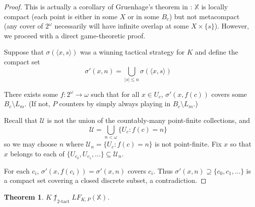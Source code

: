 \documentclass[11pt]{article}
\theoremstyle{plain}
\newtheorem{theorem}{Theorem}
\theoremstyle{definition}
\theoremstyle{remark}
\newcommand{\ktactwin}[1]{\uparrow_{#1\text{-tact}}}
\newcommand{\lfkpgame}[1]{LF_{K,P}(#1)}
\newcommand{\<}{\langle}
\renewcommand{\>}{\rangle}
\begin{document}
\begin{proof}
This is actually a corollary of Gruenhage's theorem in \cite{G2}: $\mathbb{X}$ is locally compact (each point is either in some $X$ or in some $B_c$) but not metacompact (any cover of $2^\omega$ necessarily will have infinite overlap at some $X \times \{s\}$). However, we proceed with a direct game-theoretic proof.

Suppose that $\sigma(\<x,s\>)$ was a winning tactical strategy for $K$ and define the compact set 
  \[
    \sigma'(x,n) = \bigcup_{|s|\leq n} \sigma(\<x,s\>)
  \]

There exists some $f: 2^\omega \to \omega$ such that for all $x\in U_c$, $\sigma'(x,f(c))$ covers some $B_c \setminus L_m$. (If not, $P$ counters by simply always playing in $B_c \setminus L_m$.)

Recall that $\mathcal{U}$ is not the union of the countably-many point-finite collections, and 
  \[
    \mathcal{U} = \bigcup_{n<\omega} \{U_c : f(c) = n\}
  \]
so we may choose $n$ where $\mathcal{U}_n = \{U_c : f(c) = n\}$ is not point-finite. Fix $x$ so that $x$ belongs to each of $\{U_{c_0},U_{c_1},\dots\} \subseteq \mathcal{U}_n$.

For each $c_i$, $\sigma'(x,f(c_i))=\sigma'(x,n)$ covers $c_i$. Thus $\sigma'(x,n) \supseteq \{c_0,c_1,\dots\}$ is a compact set covering a closed discrete subset, a contradiction.
\end{proof}

\begin{theorem}
$K\not\ktactwin{2}\lfkpgame{\mathbb{X}}$.
\end{theorem}
\end{document}
